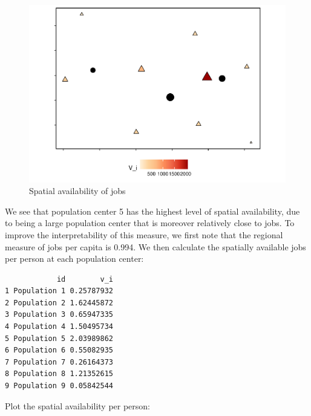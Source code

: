 \documentclass[]{elsarticle} %
\begin{document}
\begin{figure}
\includegraphics[width=1\linewidth]{Spatial-Availability_files/figure-latex/toy-example-availability-jobs-1} \caption{\label{fig:toy-example-availability-jobs}Spatial availability of jobs}\label{fig:toy-example-availability-jobs}
\end{figure}

We see that population center 5 has the highest level of spatial
availability, due to being a large population center that is moreover
relatively close to jobs. To improve the interpretability of this
measure, we first note that the regional measure of jobs per capita is
0.994. We then calculate the spatially available jobs per person at each
population center:

\begin{verbatim}
            id        v_i
1 Population 1 0.25787932
2 Population 2 1.62445872
3 Population 3 0.65947335
4 Population 4 1.50495734
5 Population 5 2.03989862
6 Population 6 0.55082935
7 Population 7 0.26164373
8 Population 8 1.21352615
9 Population 9 0.05842544
\end{verbatim}

Plot the spatial availability per person:
\end{document}
